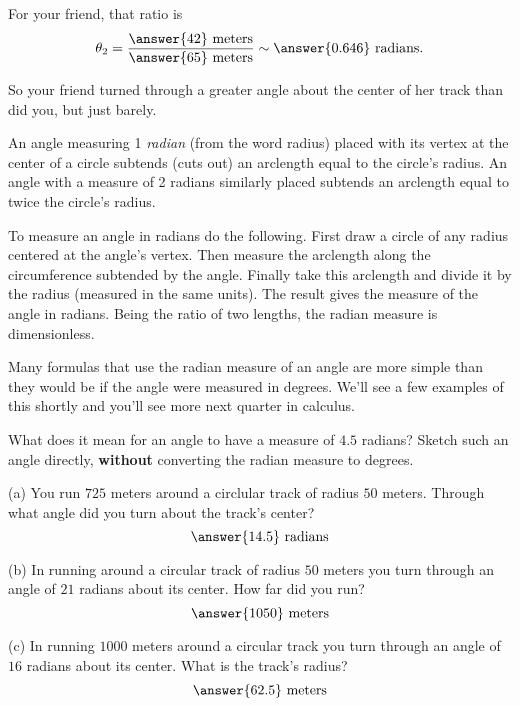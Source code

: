 \documentclass{ximera}
\begin{document}
For your friend, that ratio is
\[
       \theta_2 =  \frac{\answer{42} \text{ meters}}{\answer{65} \text{ meters}} \sim \answer{0.646} \text{ radians}.
\]

So your friend turned through a greater angle about the center of her track than did you, but just barely.

An angle measuring 1 \emph{radian} (from the word radius) placed with its vertex at the center of a circle subtends (cuts out) an arclength equal to the circle's radius. An angle with a measure of 2 radians similarly placed subtends an arclength equal to twice the circle's radius. 

To measure an angle in radians do the following. First draw a circle of any radius centered at the angle's vertex. Then measure the arclength along the circumference subtended by the angle. Finally take this arclength and divide it by the radius (measured in the same units). The result gives the measure of the angle in radians. Being the ratio of two lengths, the radian measure is dimensionless.

Many formulas that use the radian measure of an angle are more simple than they would be if the angle were measured in degrees. We'll see a few examples of this shortly and you'll see more next quarter in calculus.


\begin{question} \label{Q1:Radians}
What does it mean for an angle to have a measure of $4.5$ radians? Sketch such an angle directly, {\bf without} converting the radian measure to degrees.
\begin{freeResponse}
\end{freeResponse}
\end{question}


\begin{question} \label{Q01:Radians}
(a) You run $725$ meters around a circlular track of radius $50$ meters. Through what angle did you turn about the track's center?
\[
    \answer{14.5} \text{ radians}
\]

(b) In running around a circular track of radius $50$ meters you turn through an angle of $21$ radians about its center. How far did you run?
\[
    \answer{1050} \text{ meters}
\]

(c) In running $1000$ meters around a circular track you turn through an angle of $16$ radians about its center. What is the track's radius?
\[
   \answer{62.5} \text{ meters}
\]

\end{question}
\end{document}
